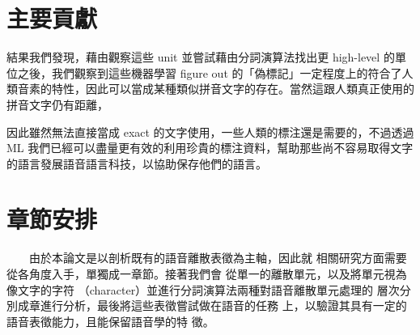 \section{主要貢獻}  %

結果我們發現，藉由觀察這些 unit 並嘗試藉由分詞演算法找出更 high-level 的單位之後，我們觀察到這些機器學習 figure out 的「偽標記」一定程度上的符合了人類音素的特性，因此可以當成某種類似拼音文字的存在。當然這跟人類真正使用的拼音文字仍有距離，

因此雖然無法直接當成 exact 的文字使用，一些人類的標注還是需要的，不過透過 ML 我們已經可以盡量更有效的利用珍貴的標注資料，幫助那些尚不容易取得文字的語言發展語音語言科技，以協助保存他們的語言。


\section{章節安排}

　　由於本論文是以剖析既有的語音離散表徵為主軸，因此就
相關研究方面需要從各角度入手，單獨成一章節。接著我們會
從單一的離散單元，以及將單元視為像文字的字符
（character）並進行分詞演算法兩種對語音離散單元處理的
層次分別成章進行分析，最後將這些表徵嘗試做在語音的任務
上，以驗證其具有一定的語音表徵能力，且能保留語音學的特
徵。

